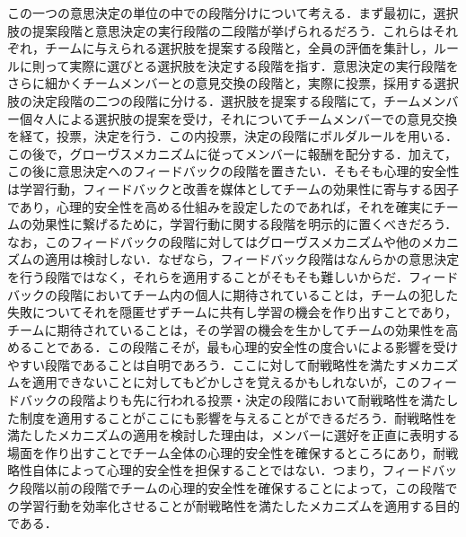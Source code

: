 \documentclass[a4paper, 11pt]{jsarticle}
\begin{document}
この一つの意思決定の単位の中での段階分けについて考える．まず最初に，選択肢の提案段階と意思決定の実行段階の二段階が挙げられるだろう．これらはそれぞれ，チームに与えられる選択肢を提案する段階と，全員の評価を集計し，ルールに則って実際に選びとる選択肢を決定する段階を指す．意思決定の実行段階をさらに細かくチームメンバーとの意見交換の段階と，実際に投票，採用する選択肢の決定段階の二つの段階に分ける．選択肢を提案する段階にて，チームメンバー個々人による選択肢の提案を受け，それについてチームメンバーでの意見交換を経て，投票，決定を行う．この内投票，決定の段階にボルダルールを用いる．この後で，グローヴスメカニズムに従ってメンバーに報酬を配分する．加えて，この後に意思決定へのフィードバックの段階を置きたい．そもそも心理的安全性は学習行動，フィードバックと改善を媒体としてチームの効果性に寄与する因子であり，心理的安全性を高める仕組みを設定したのであれば，それを確実にチームの効果性に繋げるために，学習行動に関する段階を明示的に置くべきだろう．なお，このフィードバックの段階に対してはグローヴスメカニズムや他のメカニズムの適用は検討しない．なぜなら，フィードバック段階はなんらかの意思決定を行う段階ではなく，それらを適用することがそもそも難しいからだ．フィードバックの段階においてチーム内の個人に期待されていることは，チームの犯した失敗についてそれを隠匿せずチームに共有し学習の機会を作り出すことであり，チームに期待されていることは，その学習の機会を生かしてチームの効果性を高めることである．この段階こそが，最も心理的安全性の度合いによる影響を受けやすい段階であることは自明であろう．ここに対して耐戦略性を満たすメカニズムを適用できないことに対してもどかしさを覚えるかもしれないが，このフィードバックの段階よりも先に行われる投票・決定の段階において耐戦略性を満たした制度を適用することがここにも影響を与えることができるだろう．耐戦略性を満たしたメカニズムの適用を検討した理由は，メンバーに選好を正直に表明する場面を作り出すことでチーム全体の心理的安全性を確保するところにあり，耐戦略性自体によって心理的安全性を担保することではない．つまり，フィードバック段階以前の段階でチームの心理的安全性を確保することによって，この段階での学習行動を効率化させることが耐戦略性を満たしたメカニズムを適用する目的である．
\end{document}
